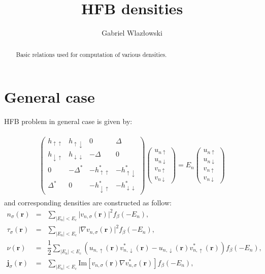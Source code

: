 \documentclass[a4paper,10pt]{article}
\title{HFB densities}
\author{Gabriel Wlaz\l{}owski}
\newcommand{\abs}[1]{\lvert{#1}\rvert}            %
\begin{document}
\maketitle

\begin{abstract}
Basic relations used for computation of various densities.
\end{abstract}

\section{General case}

HFB problem in general case is given by:

\begin{align}\label{eq:hfbspin}
\begin{gathered}
\begin{pmatrix}
h_{\uparrow \uparrow}  & h_{\uparrow \downarrow} & 0 & \Delta \\
h_{\downarrow \uparrow} & h_{\downarrow \downarrow}& -\Delta & 0 \\
0 & -\Delta^* &  -h^*_{\uparrow \uparrow}& -h^*_{\uparrow \downarrow} \\
\Delta^* & 0 & -h^*_{\downarrow \uparrow} & -h^*_{\downarrow \downarrow}
\end{pmatrix} 
\begin{pmatrix}
u_{n\uparrow} \\
u_{n\downarrow} \\
v_{n\uparrow} \\
v_{n\downarrow}
\end{pmatrix}
= E_n
\begin{pmatrix}
u_{n\uparrow} \\
u_{n\downarrow} \\
v_{n\uparrow} \\
v_{n\downarrow}
\end{pmatrix} 
\end{gathered}
\end{align}
and corresponding densities are constructed as follow:
\begin{eqnarray}
n_{\sigma}(\bm{r}) &=& \sum_{|E_n|<E_c}\abs{v_{n,\sigma}(\bm{r})}^2 f_{\beta}(-E_n),\label{eqn:densities0}\\
\tau_{\sigma}(\bm{r}) &=& \sum_{|E_n|<E_c}\abs{\nabla v_{n,\sigma}(\bm{r})}^2 f_{\beta}(-E_n),\\
\nu(\bm{r}) &=& \dfrac{1}{2}\sum_{|E_n|<E_c} (u_{n,\uparrow}(\bm{r})v_{n,\downarrow}^{*}(\bm{r})-u_{n,\downarrow}(\bm{r})v_{n,\uparrow}^{*}(\bm{r}))f_{\beta}(-E_n),\\
\bm{j}_{\sigma}(\bm{r}) &=& \sum_{|E_n|<E_c} \textrm{Im}[v_{n,\sigma}(\bm{r})\nabla v_{n,\sigma}^*(\bm{r})] f_{\beta}(-E_n),
\label{eqn:densities}
\end{eqnarray}
\end{document}
